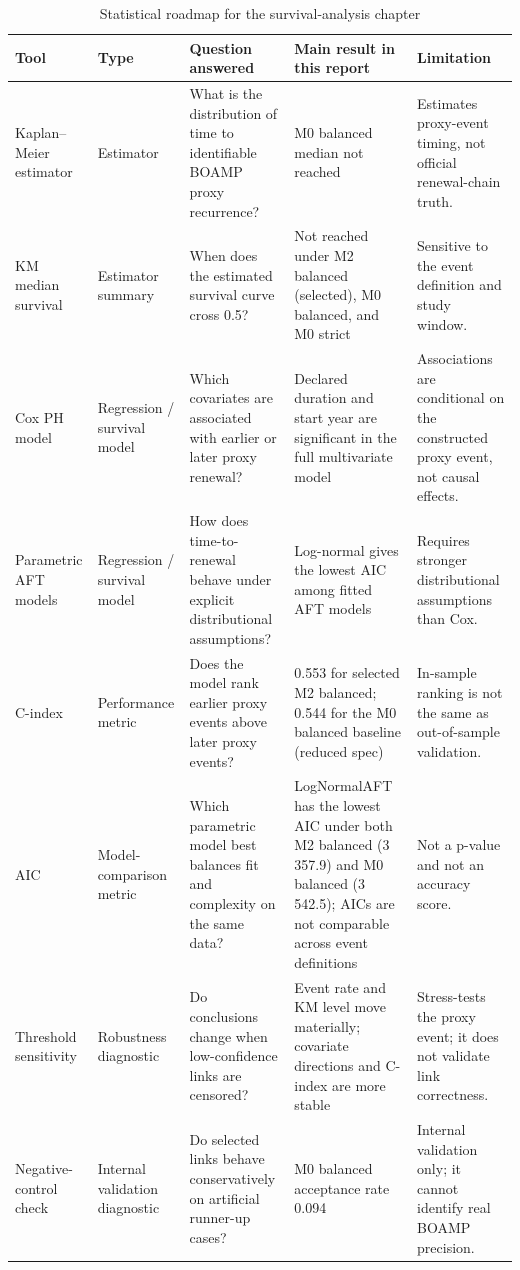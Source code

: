 \documentclass[12pt, a4paper]{article}
\begin{document}
\begin{table}[H]
\centering
\caption{Statistical roadmap for the survival-analysis chapter}
\footnotesize
\begin{tabularx}{\textwidth}{@{}P{3.0cm}P{2.0cm}X P{2.5cm} X@{}}
\toprule
Tool & Type & Question answered & Main result in this report & Limitation \\
\midrule
Kaplan--Meier estimator & Estimator & What is the distribution of time to identifiable BOAMP proxy recurrence? & M0 balanced median not reached & Estimates proxy-event timing, not official renewal-chain truth. \\
KM median survival & Estimator summary & When does the estimated survival curve cross 0.5? & Not reached under M2 balanced (selected), M0 balanced, and M0 strict & Sensitive to the event definition and study window. \\
Cox PH model & Regression / survival model & Which covariates are associated with earlier or later proxy renewal? & Declared duration and start year are significant in the full multivariate model & Associations are conditional on the constructed proxy event, not causal effects. \\
Parametric AFT models & Regression / survival model & How does time-to-renewal behave under explicit distributional assumptions? & Log-normal gives the lowest AIC among fitted AFT models & Requires stronger distributional assumptions than Cox. \\
C-index & Performance metric & Does the model rank earlier proxy events above later proxy events? & 0.553 for selected M2 balanced; 0.544 for the M0 balanced baseline (reduced spec) & In-sample ranking is not the same as out-of-sample validation. \\
AIC & Model-comparison metric & Which parametric model best balances fit and complexity on the same data? & LogNormalAFT has the lowest AIC under both M2 balanced (3\,357.9) and M0 balanced (3\,542.5); AICs are not comparable across event definitions & Not a p-value and not an accuracy score. \\
Threshold sensitivity & Robustness diagnostic & Do conclusions change when low-confidence links are censored? & Event rate and KM level move materially; covariate directions and C-index are more stable & Stress-tests the proxy event; it does not validate link correctness. \\
Negative-control check & Internal validation diagnostic & Do selected links behave conservatively on artificial runner-up cases? & M0 balanced acceptance rate 0.094 & Internal validation only; it cannot identify real BOAMP precision. \\
\bottomrule
\end{tabularx}
\normalsize
\end{table}
\end{document}
